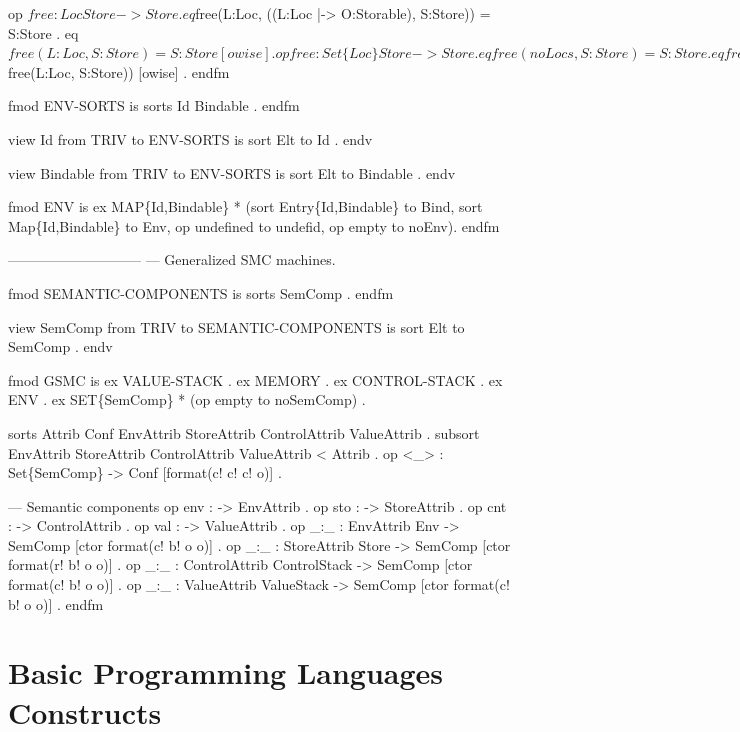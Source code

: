 \documentclass{llncs}%
\begin{document}
    op $free : Loc Store -> Store .
    eq $free(L:Loc, ((L:Loc |-> O:Storable), S:Store)) = S:Store .
    eq $free(L:Loc, S:Store) = S:Store [owise] .

    op free : Set\{Loc\} Store -> Store .
    eq free(noLocs, S:Store) = S:Store .
    eq free((L:Loc , SL:Set\{Loc\}), S:Store) =
       free(SL:Set\{Loc\}, $free(L:Loc, S:Store)) [owise] . 
endfm

fmod ENV-SORTS is
    sorts Id Bindable . 
endfm

view Id from TRIV to ENV-SORTS is sort Elt to Id . endv

view Bindable from TRIV to ENV-SORTS is sort Elt to Bindable . endv

fmod ENV is
    ex MAP\{Id,Bindable\} * (sort Entry\{Id,Bindable\} to Bind,
       sort Map\{Id,Bindable\} to Env,
       op undefined to undefid, op empty to noEnv). 
endfm

-----------------------------
--- Generalized SMC machines.

fmod SEMANTIC-COMPONENTS is
    sorts SemComp . 
endfm

view SemComp from TRIV to SEMANTIC-COMPONENTS is
    sort Elt to SemComp . 
endv

fmod GSMC is
    ex VALUE-STACK .
    ex MEMORY .
    ex CONTROL-STACK .
    ex ENV . 
    ex SET\{SemComp\} * (op empty to noSemComp) .

    sorts Attrib Conf EnvAttrib StoreAttrib ControlAttrib ValueAttrib .
    subsort EnvAttrib StoreAttrib ControlAttrib ValueAttrib < Attrib  .
    op <_> : Set\{SemComp\} -> Conf [format(c! c! c! o)] . 

    --- Semantic components
    op env : -> EnvAttrib .
    op sto : -> StoreAttrib .
    op cnt : -> ControlAttrib .
    op val : -> ValueAttrib .
    op _:_ : EnvAttrib Env -> SemComp [ctor format(c! b! o o)] .
    op _:_ : StoreAttrib Store -> SemComp [ctor format(r! b! o o)] .
    op _:_ : ControlAttrib ControlStack -> SemComp [ctor format(c! b! o o)] .
    op _:_ : ValueAttrib ValueStack -> SemComp [ctor format(c! b! o o)] .
endfm
\nwendcode{}\nwdocspar

\section{Basic Programming Languages Constructs}
\end{document}
